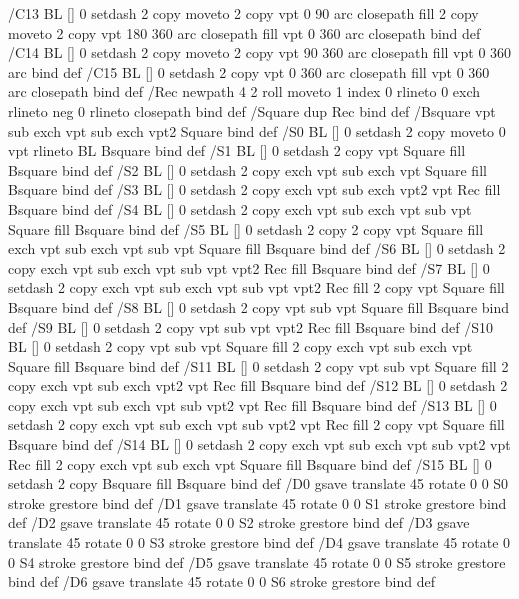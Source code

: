 {/C13 { BL [] 0 setdash  2 copy moveto
       2 copy  vpt 0 90 arc closepath fill
       2 copy moveto
       2 copy  vpt 180 360 arc closepath fill
               vpt 0 360 arc closepath } bind def
/C14 { BL [] 0 setdash 2 copy moveto
       2 copy  vpt 90 360 arc closepath fill
               vpt 0 360 arc } bind def
/C15 { BL [] 0 setdash 2 copy vpt 0 360 arc closepath fill
               vpt 0 360 arc closepath } bind def
/Rec   { newpath 4 2 roll moveto 1 index 0 rlineto 0 exch rlineto
       neg 0 rlineto closepath } bind def
/Square { dup Rec } bind def
/Bsquare { vpt sub exch vpt sub exch vpt2 Square } bind def
/S0 { BL [] 0 setdash 2 copy moveto 0 vpt rlineto BL Bsquare } bind def
/S1 { BL [] 0 setdash 2 copy vpt Square fill Bsquare } bind def
/S2 { BL [] 0 setdash 2 copy exch vpt sub exch vpt Square fill Bsquare } bind def
/S3 { BL [] 0 setdash 2 copy exch vpt sub exch vpt2 vpt Rec fill Bsquare } bind def
/S4 { BL [] 0 setdash 2 copy exch vpt sub exch vpt sub vpt Square fill Bsquare } bind def
/S5 { BL [] 0 setdash 2 copy 2 copy vpt Square fill
       exch vpt sub exch vpt sub vpt Square fill Bsquare } bind def
/S6 { BL [] 0 setdash 2 copy exch vpt sub exch vpt sub vpt vpt2 Rec fill Bsquare } bind def
/S7 { BL [] 0 setdash 2 copy exch vpt sub exch vpt sub vpt vpt2 Rec fill
       2 copy vpt Square fill
       Bsquare } bind def
/S8 { BL [] 0 setdash 2 copy vpt sub vpt Square fill Bsquare } bind def
/S9 { BL [] 0 setdash 2 copy vpt sub vpt vpt2 Rec fill Bsquare } bind def
/S10 { BL [] 0 setdash 2 copy vpt sub vpt Square fill 2 copy exch vpt sub exch vpt Square fill
       Bsquare } bind def
/S11 { BL [] 0 setdash 2 copy vpt sub vpt Square fill 2 copy exch vpt sub exch vpt2 vpt Rec fill
       Bsquare } bind def
/S12 { BL [] 0 setdash 2 copy exch vpt sub exch vpt sub vpt2 vpt Rec fill Bsquare } bind def
/S13 { BL [] 0 setdash 2 copy exch vpt sub exch vpt sub vpt2 vpt Rec fill
       2 copy vpt Square fill Bsquare } bind def
/S14 { BL [] 0 setdash 2 copy exch vpt sub exch vpt sub vpt2 vpt Rec fill
       2 copy exch vpt sub exch vpt Square fill Bsquare } bind def
/S15 { BL [] 0 setdash 2 copy Bsquare fill Bsquare } bind def
/D0 { gsave translate 45 rotate 0 0 S0 stroke grestore } bind def
/D1 { gsave translate 45 rotate 0 0 S1 stroke grestore } bind def
/D2 { gsave translate 45 rotate 0 0 S2 stroke grestore } bind def
/D3 { gsave translate 45 rotate 0 0 S3 stroke grestore } bind def
/D4 { gsave translate 45 rotate 0 0 S4 stroke grestore } bind def
/D5 { gsave translate 45 rotate 0 0 S5 stroke grestore } bind def
/D6 { gsave translate 45 rotate 0 0 S6 stroke grestore } bind def
}
